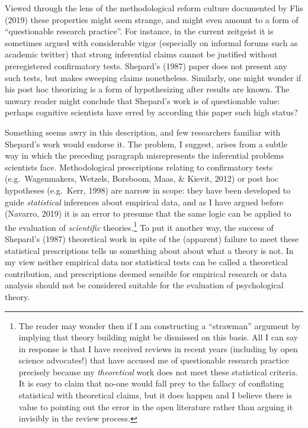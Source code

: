 \documentclass[
  english,
  doc]{apa6}
\begin{document}
Viewed through the lens of the methodological reform culture documented by Flis (2019) these properties might seem strange, and might even amount to a form of \enquote{questionable research practice}. For instance, in the current zeitgeist it is sometimes argued with considerable vigor (especially on informal forums such as academic twitter) that strong inferential claims cannot be justified without preregistered confirmatory tests. Shepard's (1987) paper does not present any such tests, but makes sweeping claims nonetheless. Similarly, one might wonder if his post hoc theorizing is a form of hypothesizing after results are known. The unwary reader might conclude that Shepard's work is of questionable value: perhaps cognitive scientists have erred by according this paper such high status?

Something seems awry in this description, and few researchers familiar with Shepard's work would endorse it. The problem, I suggest, arises from a subtle way in which the preceding paragraph misrepresents the inferential problems scientists face. Methodological prescriptions relating to confirmatory tests (e.g.~Wagenmakers, Wetzels, Borsboom, Maas, \& Kievit, 2012) or post hoc hypotheses (e.g.~Kerr, 1998) are narrow in scope: they have been developed to guide \emph{statistical} inferences about empirical data, and as I have argued before (Navarro, 2019) it is an error to presume that the same logic can be applied to the evaluation of \emph{scientific} theories.\footnote{The reader may wonder then if I am constructing a \enquote{strawman} argument by implying that theory building might be dismissed on this basis. All I can say in response is that I have received reviews in recent years (including by open science advocates!) that have accused me of questionable research practice precisely because my \emph{theoretical} work does not meet these statistical criteria. It is easy to claim that no-one would fall prey to the fallacy of conflating statistical with theoretical claims, but it does happen and I believe there is value to pointing out the error in the open literature rather than arguing it invisibly in the review process.} To put it another way, the success of Shepard's (1987) theoretical work in spite of the (apparent) failure to meet these statistical prescriptions tells us something about about what a theory is not. In my view neither empirical data nor statistical tests can be called a theoretical contribution, and prescriptions deemed sensible for empirical research or data analysis should not be considered suitable for the evaluation of psychological theory.
\end{document}

